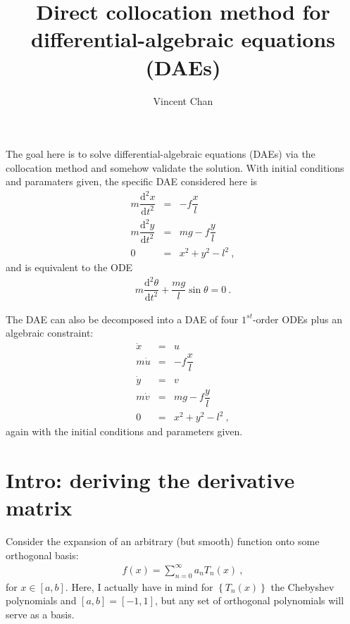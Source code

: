 \documentclass[11pt]{amsdtx}
\title{Direct collocation method for differential-algebraic equations (DAEs)}
\author{Vincent Chan}
\date{}
\newcommand{\ud}{\mathrm{d}}
\begin{document}
\maketitle

The goal here is to solve differential-algebraic equations (DAEs) via the collocation method and somehow validate the solution.  With initial conditions and paramaters given, the specific DAE considered here is
\begin{eqnarray*}
	m \dfrac{\ud^2 x}{\ud t^2} &=& -f\dfrac{x}{l} \\
	m \dfrac{\ud^2 y}{\ud t^2} &=& mg - f\dfrac{y}{l} \\
	0 &=& x^2 + y^2 - l^2 ~,
\end{eqnarray*}
and is equivalent to the ODE
\begin{eqnarray*}
	m \dfrac{\ud^2 \theta }{\ud t^2} + \dfrac{m g}{l} \sin \theta = 0~.
\end{eqnarray*}


The DAE can also be decomposed into a DAE of four $1^{st}$-order ODEs plus an algebraic constraint:
\begin{eqnarray*}
	\dot{x} &=& u \\
	m\dot{u} &=& - f\dfrac{x}{l} \\
	\dot{y} &=& v  \\
	m \dot{v} &=& mg - f\dfrac{y}{l} \\
	0 &=& x^2 + y^2 - l^2 ~,
\end{eqnarray*}
again with the initial conditions and parameters given.

\section{Intro: deriving the derivative matrix}

Consider the expansion of an arbitrary (but smooth) function onto some orthogonal basis:
\begin{eqnarray}
	f(x) = \sum_{n = 0}^{\infty} a_n T_n(x)~,
\end{eqnarray}
for $x \in \left[ a, b \right]$.  Here, I actually have in mind for $\left\lbrace T_n(x) \right\rbrace$ the Chebyshev polynomials and $[a, b] = [-1, 1]$, but any set of orthogonal polynomials will serve as a basis.
\end{document}
